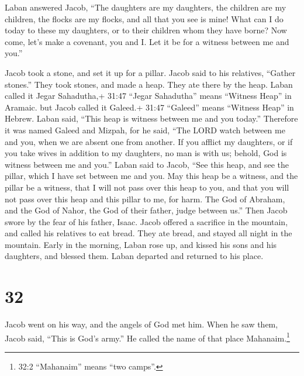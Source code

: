  Laban answered Jacob, ``The daughters are my daughters,
the children are my children, the flocks are my flocks, and all that you
see is mine! What can I do today to these my daughters, or to their
children whom they have borne?  Now come, let's make a
covenant, you and I. Let it be for a witness between me and you.''

 Jacob took a stone, and set it up for a pillar.
 Jacob said to his relatives, ``Gather stones.'' They took
stones, and made a heap. They ate there by the heap.  Laban
called it Jegar Sahadutha,+ 31:47 ``Jegar Sahadutha'' means ``Witness
Heap'' in Aramaic. but Jacob called it Galeed.+ 31:47 ``Galeed'' means
``Witness Heap'' in Hebrew.  Laban said, ``This heap is
witness between me and you today.'' Therefore it was named Galeed
 and Mizpah, for he said, ``The LORD watch between me and
you, when we are absent one from another.  If you afflict
my daughters, or if you take wives in addition to my daughters, no man
is with us; behold, God is witness between me and you.'' 
Laban said to Jacob, ``See this heap, and see the pillar, which I have
set between me and you.  May this heap be a witness, and
the pillar be a witness, that I will not pass over this heap to you, and
that you will not pass over this heap and this pillar to me, for harm.
 The God of Abraham, and the God of Nahor, the God of their
father, judge between us.'' Then Jacob swore by the fear of his father,
Isaac.  Jacob offered a sacrifice in the mountain, and
called his relatives to eat bread. They ate bread, and stayed all night
in the mountain.  Early in the morning, Laban rose up, and
kissed his sons and his daughters, and blessed them. Laban departed and
returned to his place.

\hypertarget{section-31}{%
\section{32}\label{section-31}}

 Jacob went on his way, and the angels of God met him.
 When he saw them, Jacob said, ``This is God's army.'' He
called the name of that place Mahanaim.\footnote{32:2 ``Mahanaim'' means
  ``two camps''.}

